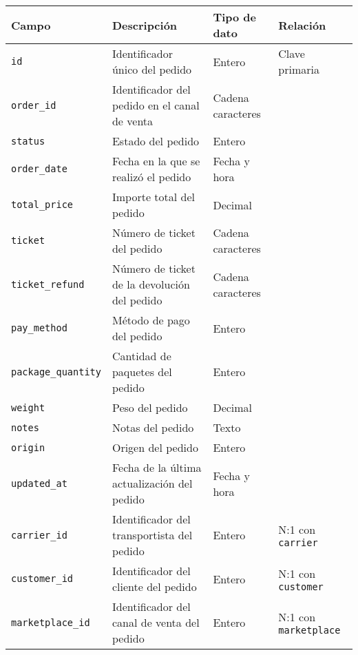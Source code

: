 \begin{table}[H]
    \centering
    \begin{tabular}{l p{4cm} p{3cm} l}
        \textbf{Campo}             & \textbf{Descripción}                          & \textbf{Tipo de dato} & \textbf{Relación}            \\ \hline \hline
        \texttt{id}                & Identificador único del pedido                & Entero                & Clave primaria               \\
        \texttt{order\_id}         & Identificador del pedido en el canal de venta & Cadena caracteres     &                              \\
        \texttt{status}            & Estado del pedido                             & Entero                &                              \\
        \texttt{order\_date}       & Fecha en la que se realizó el pedido          & Fecha y hora          &                              \\
        \texttt{total\_price}      & Importe total del pedido                      & Decimal               &                              \\
        \texttt{ticket}            & Número de ticket del pedido                   & Cadena caracteres     &                              \\
        \texttt{ticket\_refund}    & Número de ticket de la devolución del pedido  & Cadena caracteres     &                              \\
        \texttt{pay\_method}       & Método de pago del pedido                     & Entero                &                              \\
        \texttt{package\_quantity} & Cantidad de paquetes del pedido               & Entero                &                              \\
        \texttt{weight}            & Peso del pedido                               & Decimal               &                              \\
        \texttt{notes}             & Notas del pedido                              & Texto                 &                              \\
        \texttt{origin}            & Origen del pedido                             & Entero                &                              \\
        \texttt{updated\_at}       & Fecha de la última actualización del pedido   & Fecha y hora          &                              \\
        \texttt{carrier\_id}       & Identificador del transportista del pedido    & Entero                & N:1 con \texttt{carrier}     \\
        \texttt{customer\_id}      & Identificador del cliente del pedido          & Entero                & N:1 con \texttt{customer}    \\
        \texttt{marketplace\_id}   & Identificador del canal de venta del pedido   & Entero                & N:1 con \texttt{marketplace}
    \end{tabular}
\end{table}